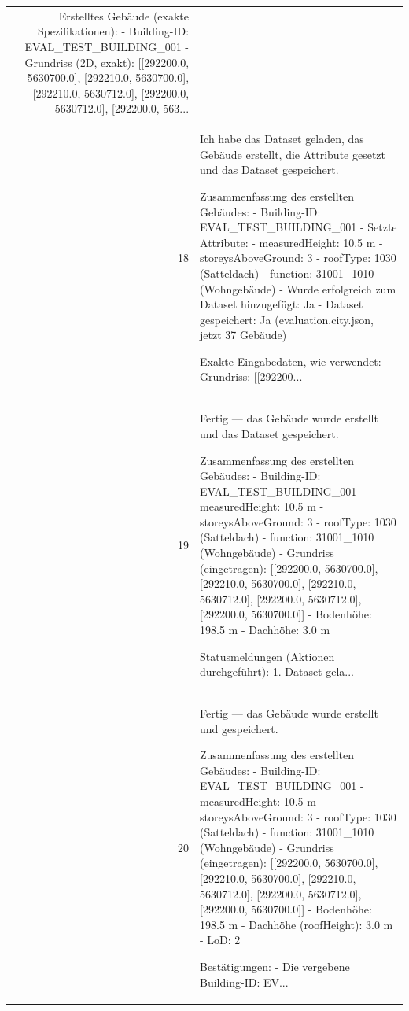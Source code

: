 \documentclass[a4paper,11pt]{article}
\begin{document}
\begin{table}[ht]
\begin{tabular}{r p{12cm}}
Erstelltes Gebäude (exakte Spezifikationen):
- Building-ID: EVAL\_TEST\_BUILDING\_001
- Grundriss (2D, exakt): [[292200.0, 5630700.0], [292210.0, 5630700.0], [292210.0, 5630712.0], [292200.0, 5630712.0], [292200.0, 563... \\
18 & Ich habe das Dataset geladen, das Gebäude erstellt, die Attribute gesetzt und das Dataset gespeichert.

Zusammenfassung des erstellten Gebäudes:
- Building-ID: EVAL\_TEST\_BUILDING\_001
- Setzte Attribute:
  - measuredHeight: 10.5 m
  - storeysAboveGround: 3
  - roofType: 1030 (Satteldach)
  - function: 31001\_1010 (Wohngebäude)
- Wurde erfolgreich zum Dataset hinzugefügt: Ja
- Dataset gespeichert: Ja (evaluation.city.json, jetzt 37 Gebäude)

Exakte Eingabedaten, wie verwendet:
- Grundriss: [[292200... \\
19 & Fertig — das Gebäude wurde erstellt und das Dataset gespeichert.

Zusammenfassung des erstellten Gebäudes:
- Building-ID: EVAL\_TEST\_BUILDING\_001
- measuredHeight: 10.5 m
- storeysAboveGround: 3
- roofType: 1030 (Satteldach)
- function: 31001\_1010 (Wohngebäude)
- Grundriss (eingetragen): [[292200.0, 5630700.0], [292210.0, 5630700.0], [292210.0, 5630712.0], [292200.0, 5630712.0], [292200.0, 5630700.0]]
- Bodenhöhe: 198.5 m
- Dachhöhe: 3.0 m

Statusmeldungen (Aktionen durchgeführt):
1. Dataset gela... \\
20 & Fertig — das Gebäude wurde erstellt und gespeichert.

Zusammenfassung des erstellten Gebäudes:
- Building-ID: EVAL\_TEST\_BUILDING\_001
- measuredHeight: 10.5 m
- storeysAboveGround: 3
- roofType: 1030 (Satteldach)
- function: 31001\_1010 (Wohngebäude)
- Grundriss (eingetragen): [[292200.0, 5630700.0], [292210.0, 5630700.0], [292210.0, 5630712.0], [292200.0, 5630712.0], [292200.0, 5630700.0]]
- Bodenhöhe: 198.5 m
- Dachhöhe (roofHeight): 3.0 m
- LoD: 2

Bestätigungen:
- Die vergebene Building-ID: EV... \\
\hline
\end{tabular}
\end{table}

\clearpage
\end{document}
